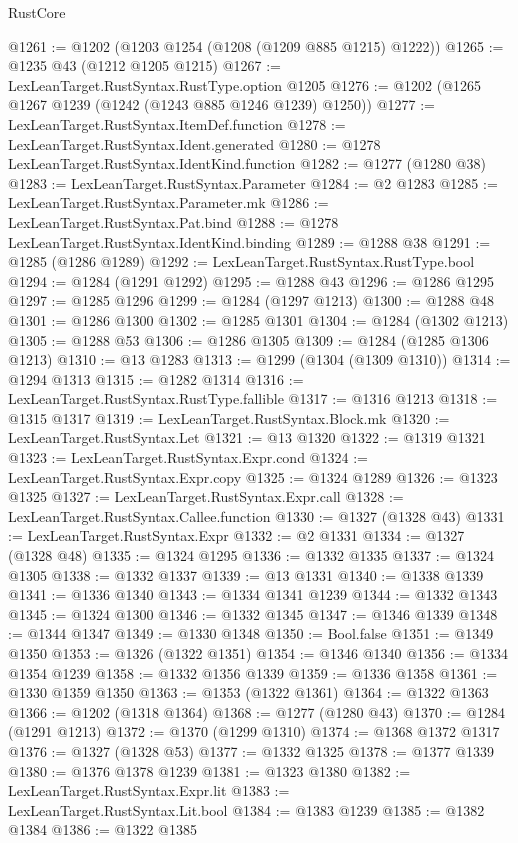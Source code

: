 \begin{lexlean}{RustCore}
\begin{coremodule}
@1261 := @1202 (@1203 @1254 (@1208 (@1209 @885 @1215) @1222))
@1265 := @1235 @43 (@1212 @1205 @1215)
@1267 := LexLeanTarget.RustSyntax.RustType.option @1205
@1276 := @1202 (@1265 @1267 @1239 (@1242 (@1243 @885 @1246 @1239) @1250))
@1277 := LexLeanTarget.RustSyntax.ItemDef.function
@1278 := LexLeanTarget.RustSyntax.Ident.generated
@1280 := @1278 LexLeanTarget.RustSyntax.IdentKind.function
@1282 := @1277 (@1280 @38)
@1283 := LexLeanTarget.RustSyntax.Parameter
@1284 := @2 @1283
@1285 := LexLeanTarget.RustSyntax.Parameter.mk
@1286 := LexLeanTarget.RustSyntax.Pat.bind
@1288 := @1278 LexLeanTarget.RustSyntax.IdentKind.binding
@1289 := @1288 @38
@1291 := @1285 (@1286 @1289)
@1292 := LexLeanTarget.RustSyntax.RustType.bool
@1294 := @1284 (@1291 @1292)
@1295 := @1288 @43
@1296 := @1286 @1295
@1297 := @1285 @1296
@1299 := @1284 (@1297 @1213)
@1300 := @1288 @48
@1301 := @1286 @1300
@1302 := @1285 @1301
@1304 := @1284 (@1302 @1213)
@1305 := @1288 @53
@1306 := @1286 @1305
@1309 := @1284 (@1285 @1306 @1213)
@1310 := @13 @1283
@1313 := @1299 (@1304 (@1309 @1310))
@1314 := @1294 @1313
@1315 := @1282 @1314
@1316 := LexLeanTarget.RustSyntax.RustType.fallible
@1317 := @1316 @1213
@1318 := @1315 @1317
@1319 := LexLeanTarget.RustSyntax.Block.mk
@1320 := LexLeanTarget.RustSyntax.Let
@1321 := @13 @1320
@1322 := @1319 @1321
@1323 := LexLeanTarget.RustSyntax.Expr.cond
@1324 := LexLeanTarget.RustSyntax.Expr.copy
@1325 := @1324 @1289
@1326 := @1323 @1325
@1327 := LexLeanTarget.RustSyntax.Expr.call
@1328 := LexLeanTarget.RustSyntax.Callee.function
@1330 := @1327 (@1328 @43)
@1331 := LexLeanTarget.RustSyntax.Expr
@1332 := @2 @1331
@1334 := @1327 (@1328 @48)
@1335 := @1324 @1295
@1336 := @1332 @1335
@1337 := @1324 @1305
@1338 := @1332 @1337
@1339 := @13 @1331
@1340 := @1338 @1339
@1341 := @1336 @1340
@1343 := @1334 @1341 @1239
@1344 := @1332 @1343
@1345 := @1324 @1300
@1346 := @1332 @1345
@1347 := @1346 @1339
@1348 := @1344 @1347
@1349 := @1330 @1348
@1350 := Bool.false
@1351 := @1349 @1350
@1353 := @1326 (@1322 @1351)
@1354 := @1346 @1340
@1356 := @1334 @1354 @1239
@1358 := @1332 @1356 @1339
@1359 := @1336 @1358
@1361 := @1330 @1359 @1350
@1363 := @1353 (@1322 @1361)
@1364 := @1322 @1363
@1366 := @1202 (@1318 @1364)
@1368 := @1277 (@1280 @43)
@1370 := @1284 (@1291 @1213)
@1372 := @1370 (@1299 @1310)
@1374 := @1368 @1372 @1317
@1376 := @1327 (@1328 @53)
@1377 := @1332 @1325
@1378 := @1377 @1339
@1380 := @1376 @1378 @1239
@1381 := @1323 @1380
@1382 := LexLeanTarget.RustSyntax.Expr.lit
@1383 := LexLeanTarget.RustSyntax.Lit.bool
@1384 := @1383 @1239
@1385 := @1382 @1384
@1386 := @1322 @1385

\end{coremodule}
\end{lexlean}
